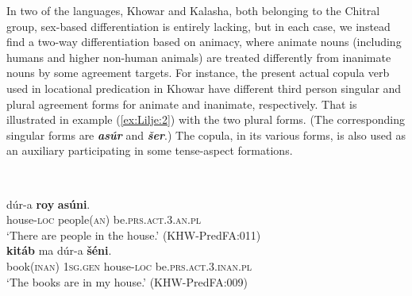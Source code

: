 \documentclass[output=collectionpaper]{langsci/langscibook}
\begin{document}
%

In two of the languages, Khowar and Kalasha, both belonging to the Chitral group, sex-based differentiation is entirely lacking, but in each case, we instead find a two-way differentiation based on animacy, where animate nouns (including humans and higher non-human animals) are treated differently from inanimate nouns by some agreement targets. For instance, the present actual copula verb used in locational predication in Khowar have different third person singular and plural agreement forms for animate and inanimate, respectively. That is illustrated in example (\ref{ex:Lilje:2}) with the two plural forms. (The corresponding singular forms are \textbf{\textit{asú}}\textbf{\textit{r}} and \textbf{\textit{šer}}.) The copula, in its various forms, is also used as an auxiliary participating in some tense-aspect formations.

\ea
\label{ex:Lilje:2}
\\
\begin{xlist}
\ex
\gll dúr-a \textbf{roy}  \textbf{asúni}.     \\
house-\textsc{loc} people(\textsc{an}) be\textsc{.prs.act.3.an.}\textsc{pl}     \\
\glt `There are people in the house.' (KHW-PredFA:011)\\
\ex
\gll \textbf{kitáb}  ma dúr-a  \textbf{šéni}.    \\
book(\textsc{inan}) \textsc{1sg.gen} house-\textsc{loc} be\textsc{.prs.act.3.inan.pl}    \\
\glt `The books are in my house.' (KHW-PredFA:009)\\
\end{xlist}
\z
\end{document}
